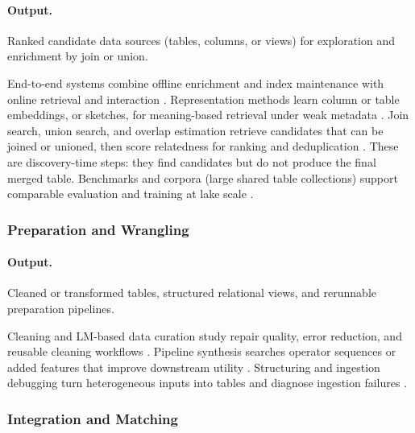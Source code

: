 \documentclass[sigconf,nonacm]{acmart}
\begin{document}
\paragraph{Output.} Ranked candidate data sources (tables, columns, or views) for exploration and enrichment by join or union.

End-to-end systems combine offline enrichment and index maintenance with online retrieval and interaction \cite{10.14778/3685800.3685880,11112882,10.14778/3659437.3659461}.
Representation methods learn column or table embeddings, or sketches, for meaning-based retrieval under weak metadata \cite{10.14778/3587136.3587146,11113165,11113110}.
Join search, union search, and overlap estimation retrieve candidates that can be joined or unioned, then score relatedness for ranking and deduplication \cite{10.14778/3603581.3603587,10.1145/3588689,10.1145/3725365}. These are discovery-time steps: they find candidates but do not produce the final merged table.
Benchmarks and corpora (large shared table collections) support comparable evaluation and training at lake scale \cite{10.1145/3588710,10.14778/3659437.3659448}.


\subsubsection{Preparation and Wrangling}
\paragraph{Output.} Cleaned or transformed tables, structured relational views, and rerunnable preparation pipelines.

Cleaning and LM-based data curation study repair quality, error reduction, and reusable cleaning workflows \cite{10.14778/3675034.3675051,10.14778/3574245.3574258,10.14778/3611540.3611624,10.14778/3611540.3611628}.
Pipeline synthesis searches operator sequences or added features that improve downstream utility \cite{10.1145/3698831,10.1145/3588945,11113027,10.14778/3603581.3603596}.
Structuring and ingestion debugging turn heterogeneous inputs into tables and diagnose ingestion failures \cite{10.14778/3626292.3626294,10.1145/3665252.3665269,10.14778/3681954.3682019,10.14778/3611540.3611595}.


\subsubsection{Integration and Matching}
\end{document}
